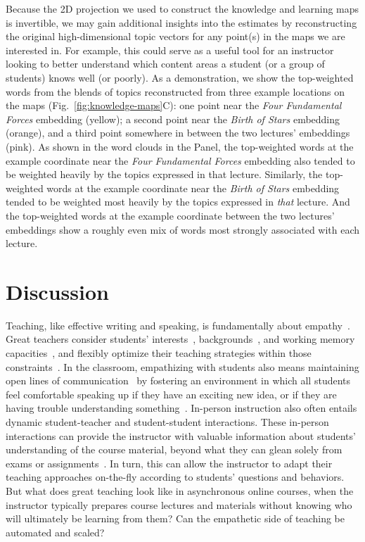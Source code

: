 \documentclass[10pt]{article}
\begin{document}
Because the 2D projection we used to construct the knowledge and learning maps
is invertible, we may gain additional insights into the estimates
by reconstructing the original high-dimensional topic vectors for any point(s)
in the maps we are interested in. For example, this could serve as a useful
tool for an instructor looking to better understand which content areas a
student (or a group of students) knows well (or poorly). As a demonstration, we
show the top-weighted words from the blends of topics reconstructed from three
example locations on the maps (Fig.~\ref{fig:knowledge-maps}C): one point near
the \textit{Four Fundamental Forces} embedding (yellow); a second point near
the \textit{Birth of Stars} embedding (orange), and a third point somewhere in
between the two lectures' embeddings (pink). As shown in the word clouds in the
Panel, the top-weighted words at the example coordinate near the \textit{Four
Fundamental Forces} embedding also tended to be weighted heavily by the topics
expressed in that lecture. Similarly, the top-weighted words at the example
coordinate near the \textit{Birth of Stars} embedding tended to be weighted
most heavily by the topics expressed in \textit{that} lecture. And the
top-weighted words at the example coordinate between the two lectures'
embeddings show a roughly even mix of words most strongly associated with each
lecture.

\section*{Discussion}

Teaching, like effective writing and speaking, is fundamentally about
empathy~\citep{AldrEtal22, StojEtal12, MeyeEtal19}. Great teachers consider
students' interests~\citep{SwarEtal12, Clar10}, backgrounds~\citep{MuijReyn10,
Rose76, denBEtal10}, and working memory capacities~\citep{Allo12}, and flexibly
optimize their teaching strategies within those constraints~\citep{GoodEtal07,
AndeEtal21, John02}. In the classroom, empathizing with students also means
maintaining open lines of communication~\citep{WulfWulf10} by fostering an
environment in which all students feel comfortable speaking up if they have an
exciting new idea, or if they are having trouble understanding
something~\citep{TurnBrai15, GarrRasm14}. In-person instruction also often
entails dynamic student-teacher and student-student interactions. These
in-person interactions can provide the instructor with valuable information
about students' understanding of the course material, beyond what they can
glean solely from exams or assignments~\citep{Engl09, vandEtal10c, HallWals02}.
In turn, this can allow the instructor to adapt their teaching approaches
on-the-fly according to students' questions and behaviors. But what does great
teaching look like in asynchronous online courses, when the instructor
typically prepares course lectures and materials without knowing who will
ultimately be learning from them? Can the empathetic side of teaching be
automated and scaled?
\end{document}
